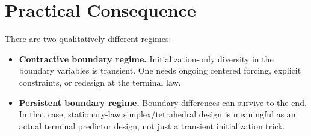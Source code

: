 \documentclass[11pt]{article}
\theoremstyle{remark}
\begin{document}
\section{Practical Consequence}

There are two qualitatively different regimes:
\begin{itemize}
\item \textbf{Contractive boundary regime.}
  Initialization-only diversity in the boundary variables is transient. One needs ongoing centered forcing, explicit constraints, or redesign at the terminal law.
\item \textbf{Persistent boundary regime.}
  Boundary differences can survive to the end. In that case, stationary-law simplex/tetrahedral design is meaningful as an actual terminal predictor design, not just a transient initialization trick.
\end{itemize}
\end{document}
